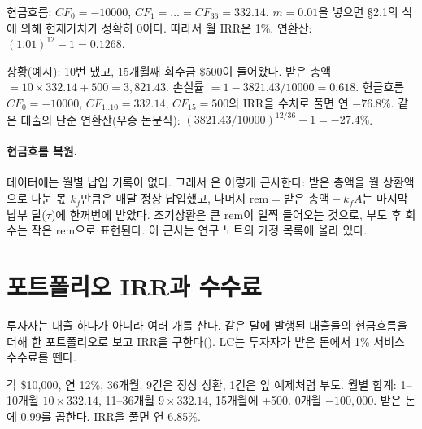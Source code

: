 \begin{workout}
 현금흐름: $CF_0=-10000$, $CF_1=\dots=CF_{36}=332.14$.
 $m=0.01$을 넣으면 \S2.1의 식에 의해 현재가치가 정확히 0이다. 따라서 월 IRR은 1\%. 
 연환산: $(1.01)^{12}-1=0.1268$. 
\end{workout}

\begin{workout}[10개월 내고 부도 난 대출]
 상황(예시): 10번 냈고, 15개월째 회수금 \$500이 들어왔다. 받은 총액 $=10\times332.14+500=3{,}821.43$.
 손실률 $=1-3821.43/10000=0.618$. 
 현금흐름 $CF_0=-10000$, $CF_{1..10}=332.14$, $CF_{15}=500$의 IRR을 수치로 풀면 연 $-76.8\%$.
 같은 대출의 단순 연환산(우승 논문식): $(3821.43/10000)^{12/36}-1=-27.4\%$.
\end{workout}

\paragraph{현금흐름 복원.} 데이터에는 월별 납입 기록이 없다. 그래서 은 이렇게 근사한다: 받은 총액을 월 상환액으로 나눈 몫 $k_f$만큼은 매달 정상 납입했고, 나머지 $\text{rem}=\text{받은 총액}-k_f A$는 마지막 납부 달($\tau$)에 한꺼번에 받았다. 조기상환은 큰 rem이 일찍 들어오는 것으로, 부도 후 회수는 작은 rem으로 표현된다. 이 근사는 연구 노트의 가정 목록에 올라 있다.

\section{포트폴리오 IRR과 수수료}
투자자는 대출 하나가 아니라 여러 개를 산다. 같은 달에 발행된 대출들의 현금흐름을 더해 한 포트폴리오로 보고 IRR을 구한다(). LC는 투자자가 받은 돈에서 1\% 서비스 수수료를 뗀다.

\begin{workout}[정상 9건 + 부도 1건]
 각 \$10,000, 연 12\%, 36개월. 9건은 정상 상환, 1건은 앞 예제처럼 부도.
 월별 합계: 1--10개월 $10\times332.14$, 11--36개월 $9\times332.14$, 15개월에 +500. 0개월 $-100{,}000$.
 받은 돈에 0.99를 곱한다. 
 IRR을 풀면 연 6.85\%.
\end{workout}


